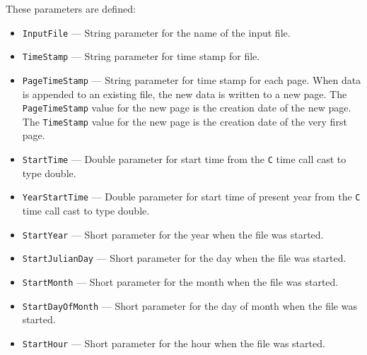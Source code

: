 \begin{itemize}
\begin{itemize}
These parameters are defined:
\begin{itemize}
        \item {\tt InputFile} --- String parameter for the name of the input file.
        \item {\tt TimeStamp} --- String parameter for time stamp for file.
        \item {\tt PageTimeStamp} --- String parameter for time stamp for each page. When data
                is appended to an existing file, the new data is written to a new
                page. The {\tt PageTimeStamp} value for the new page is the creation
                date of the new page. The {\tt TimeStamp} value for the new page is the creation 
                date of the very first page.
        \item {\tt StartTime} --- Double parameter for start time from the {\tt C} time call cast to type double.
        \item {\tt YearStartTime} --- Double parameter for start time of present year from the {\tt C} time call cast to type double.
        \item {\verb+StartYear+} --- Short parameter for the year when the file was started.
        \item {\verb+StartJulianDay+} --- Short parameter for the day when the file was started.
        \item {\verb+StartMonth+} --- Short parameter for the month when the file was started.
        \item {\verb+StartDayOfMonth+} --- Short parameter for the day of month when the file was started.
        \item {\verb+StartHour+} --- Short parameter for the hour when the file was started.
\end{itemize}
\end{itemize} %



\end{itemize}
